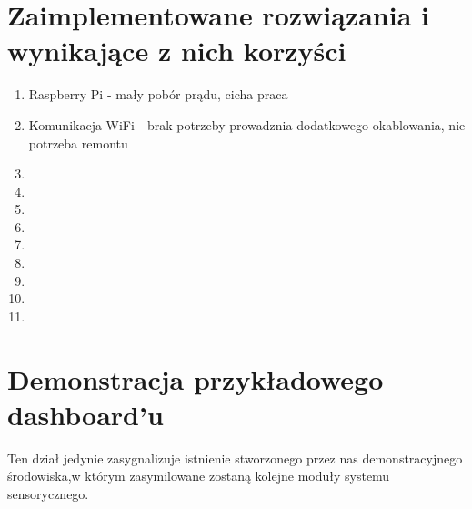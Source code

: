 \documentclass[12pt]{article} %
\begin{document}
\section{Zaimplementowane rozwiązania i wynikające z nich korzyści}
\begin{enumerate}
\item Raspberry Pi - mały pobór prądu, cicha praca
\item Komunikacja WiFi - brak potrzeby prowadznia dodatkowego okablowania, nie potrzeba remontu
\item 
\item 
\item 
\item 
\item 
\item 
\item 
\item 
\item 
\end{enumerate}

\section{Demonstracja przykładowego dashboard'u}
Ten dział jedynie zasygnalizuje istnienie stworzonego przez nas demonstracyjnego środowiska,w którym zasymilowane zostaną kolejne moduły systemu sensorycznego.
\end{document}
